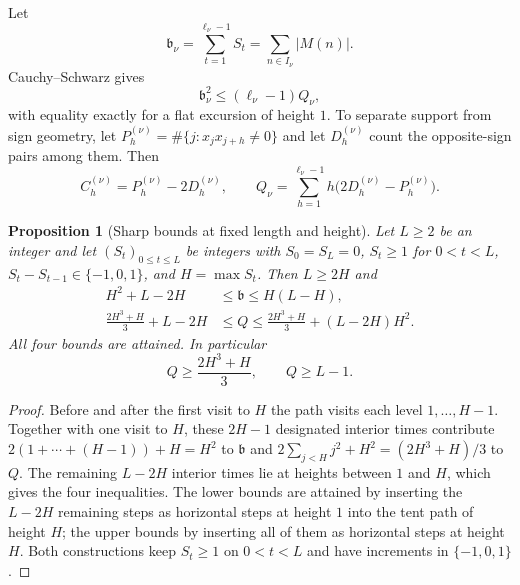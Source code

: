 \documentclass[11pt,reqno]{amsart}
\numberwithin{equation}{section}
\theoremstyle{plain}
\newtheorem{proposition}[theorem]{Proposition}
\theoremstyle{definition}
\theoremstyle{remark}
\begin{document}
Let
\begin{equation}
\label{eq:beta_def}
\mathfrak b_\nu=\sum_{t=1}^{\ell_\nu-1}S_t=\sum_{n\in I_\nu}|M(n)|.
\end{equation}
Cauchy--Schwarz gives
\begin{equation}
\label{eq:beta-Q}
\mathfrak b_\nu^2\le(\ell_\nu-1)Q_\nu,
\end{equation}
with equality exactly for a flat excursion of height $1$. To separate
support from sign geometry, let $P_h^{(\nu)}=\#\{j:x_jx_{j+h}\ne0\}$ and let
$D_h^{(\nu)}$ count the opposite-sign pairs among them. Then
\begin{equation}
\label{eq:C-P-D}
C_h^{(\nu)}=P_h^{(\nu)}-2D_h^{(\nu)},\qquad
Q_\nu=\sum_{h=1}^{\ell_\nu-1}h\bigl(2D_h^{(\nu)}-P_h^{(\nu)}\bigr).
\end{equation}

\begin{proposition}[Sharp bounds at fixed length and height]
\label{prop:sharp-LH}
Let $L\ge2$ be an integer and let $(S_t)_{0\le t\le L}$ be integers
with $S_0=S_L=0$, $S_t\ge1$ for $0<t<L$, $S_t-S_{t-1}\in\{-1,0,1\}$, and
$H=\max S_t$. Then $L\ge2H$ and
\begin{align}
H^2+L-2H&\le\mathfrak b\le H(L-H),\label{eq:beta-LH}\\
\frac{2H^3+H}{3}+L-2H&\le Q\le
\frac{2H^3+H}{3}+(L-2H)H^2.\label{eq:Q-LH}
\end{align}
All four bounds are attained. In particular
\begin{equation}
\label{eq:height_Q_min}
Q\ge\frac{2H^3+H}{3},\qquad Q\ge L-1.
\end{equation}
\end{proposition}

\begin{proof}
Before and after the first visit to $H$ the path visits each level
$1,\dots,H-1$. Together with one visit to $H$, these $2H-1$ designated
interior times contribute $2(1+\cdots+(H-1))+H=H^2$ to $\mathfrak b$ and
$2\sum_{j<H}j^2+H^2=(2H^3+H)/3$ to $Q$. The remaining $L-2H$ interior times
lie at heights between $1$ and $H$, which gives the four inequalities. The
lower bounds are attained by inserting the $L-2H$ remaining steps as
horizontal steps at height $1$ into the tent path of height $H$; the upper
bounds by inserting all of them as horizontal steps at height $H$. Both
constructions keep $S_t\ge1$ on $0<t<L$ and have increments in
$\{-1,0,1\}$.
\end{proof}
\end{document}
